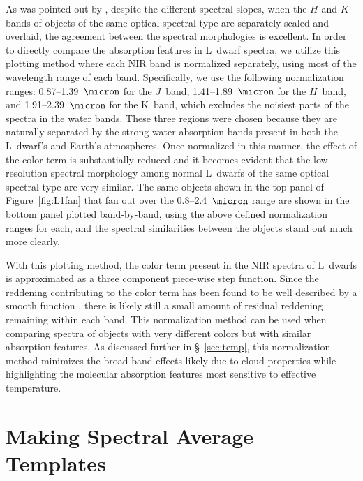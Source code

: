 \documentclass[12pt,preprint]{aastex}
\begin{document}
As was pointed out by \citet{Leggett:2003tm}, despite the different spectral slopes, when the $H$ and $K$ bands of objects of the same optical spectral type are separately scaled and overlaid, the agreement between the spectral morphologies is excellent.
In order to directly compare the absorption features in L~dwarf spectra, we utilize this plotting method where each NIR band is normalized separately, using most of the wavelength range of each band. 
Specifically, we use the following normalization ranges: 0.87--1.39~$\micron$ for the $J$~band, 1.41--1.89~$\micron$ for the $H$~band, and 1.91--2.39~$\micron$ for the K~band, which excludes the noisiest parts of the spectra in the water bands.
These three regions were chosen because they are naturally separated by the strong water absorption bands present in both the L~dwarf's and Earth's atmospheres. 
Once normalized in this manner, the effect of the color term is substantially reduced and it becomes evident that the low-resolution spectral morphology among normal L~dwarfs of the same optical spectral type are very similar. 
The same objects shown in the top panel of Figure~\ref{fig:L1fan} that fan out over the 0.8--2.4~$\micron$ range are shown in the bottom panel plotted band-by-band, using the above defined normalization ranges for each, and the spectral similarities between the objects stand out much more clearly.

With this plotting method, the color term present in the NIR spectra of L~dwarfs is approximated as a three component piece-wise step function. Since the reddening contributing to the color term has been found to be well described by a smooth function \citep[in prep.]{Hiranaka13,Marocco:2014kr}, there is likely still a small amount of residual reddening remaining within each band.
This normalization method can be used when comparing spectra of objects with very different colors but with similar absorption features. As discussed further in \S~\ref{sec:temp}, this normalization method minimizes the broad band effects likely due to cloud properties while highlighting the molecular absorption features most sensitive to effective temperature. 

\clearpage
\section{Making Spectral Average Templates}
\label{sec:templates}
\end{document}
